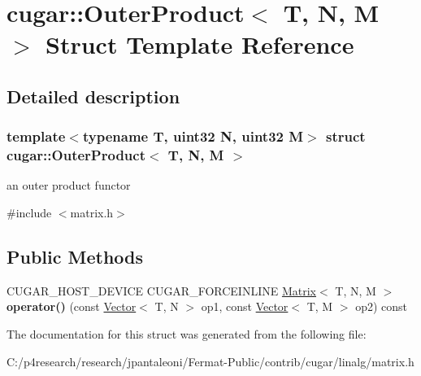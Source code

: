 \hypertarget{structcugar_1_1_outer_product}{}\section{cugar\+:\+:Outer\+Product$<$ T, N, M $>$ Struct Template Reference}
\label{structcugar_1_1_outer_product}


\subsection{Detailed description}
\subsubsection*{template$<$typename T, uint32 N, uint32 M$>$\newline
struct cugar\+::\+Outer\+Product$<$ T, N, M $>$}

an outer product functor 

{\ttfamily \#include $<$matrix.\+h$>$}

\subsection*{Public Methods}
\begin{DoxyCompactItemize}
\item 
\mbox{\label{structcugar_1_1_outer_product_a3e63e55926c99055fc54ad068a11701d}} 
C\+U\+G\+A\+R\+\_\+\+H\+O\+S\+T\+\_\+\+D\+E\+V\+I\+CE C\+U\+G\+A\+R\+\_\+\+F\+O\+R\+C\+E\+I\+N\+L\+I\+NE \hyperlink{structcugar_1_1_matrix}{Matrix}$<$ T, N, M $>$ {\bfseries operator()} (const \hyperlink{structcugar_1_1_vector}{Vector}$<$ T, N $>$ op1, const \hyperlink{structcugar_1_1_vector}{Vector}$<$ T, M $>$ op2) const
\end{DoxyCompactItemize}


The documentation for this struct was generated from the following file\+:\begin{DoxyCompactItemize}
\item 
C\+:/p4research/research/jpantaleoni/\+Fermat-\/\+Public/contrib/cugar/linalg/matrix.\+h\end{DoxyCompactItemize}
